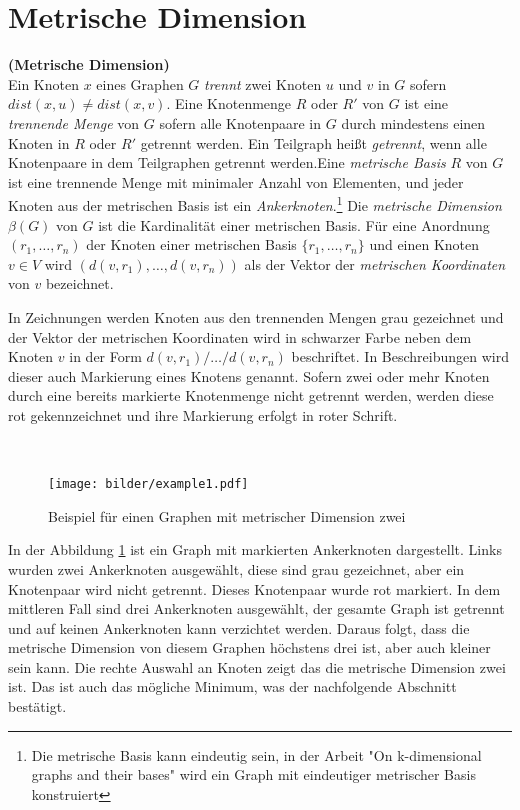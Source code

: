 \newpage
\section{Metrische Dimension}
\label{MDT}
\begin{defi}{\textbf{(Metrische Dimension)}}\\
Ein Knoten $x$ eines Graphen $G$ \emph{trennt} zwei Knoten $u$ und $v$ in $G$ sofern $dist(x, u) \neq dist(x, v)$. Eine Knotenmenge $R$ oder $R'$ von $G$ ist eine \emph{trennende Menge} von $G$ sofern alle Knotenpaare in $G$ durch mindestens einen Knoten in $R$ oder $R'$ getrennt werden. Ein Teilgraph heißt \emph{getrennt}, wenn alle Knotenpaare in dem Teilgraphen getrennt werden.\newline \newline Eine \emph{metrische Basis} $R$ von $G$ ist eine trennende Menge mit minimaler Anzahl von Elementen, und jeder Knoten aus der metrischen Basis ist ein \emph{Ankerknoten}.\footnote{Die metrische Basis kann eindeutig sein, in der Arbeit "On k-dimensional graphs and their bases" \cite{bases} wird ein Graph mit eindeutiger metrischer Basis konstruiert} \newline\newline %
Die \emph{metrische Dimension $\beta(G)$} von $G$ ist die Kardinalität einer metrischen Basis. Für eine Anordnung $(r_1,\ldots,r_n)$ der Knoten einer metrischen Basis $\{r_1,\ldots,r_n\}$ und einen Knoten $v \in V$ wird $(d(v, r_1 ), \ldots , d(v, r_n ))$ als der Vektor der \emph{metrischen Koordinaten} von $v$ bezeichnet.
\end{defi}
\begin{bem}
In Zeichnungen werden Knoten aus den trennenden Mengen grau gezeichnet und der Vektor der metrischen Koordinaten wird in schwarzer Farbe neben dem Knoten $v$ in der Form $d(v, r_1 )/ \ldots / d(v, r_n )$ beschriftet. In Beschreibungen wird dieser auch Markierung eines Knotens genannt. Sofern zwei oder mehr Knoten durch eine bereits markierte Knotenmenge nicht getrennt werden, werden diese rot gekennzeichnet und ihre Markierung erfolgt in roter Schrift. 
\end{bem}
\begin{bsp}~
\begin{figure}[h!]
		\centering 		 
   \texttt{[image: bilder/example1.pdf]}
	\caption{Beispiel für einen Graphen mit metrischer Dimension zwei}
  	 \label{bild:bsp}
  	 \end{figure}
In der Abbildung \ref{bild:bsp} ist ein Graph mit markierten Ankerknoten dargestellt.
Links wurden zwei Ankerknoten ausgewählt, diese sind grau gezeichnet, aber ein Knotenpaar wird nicht getrennt. Dieses Knotenpaar wurde rot markiert. In dem mittleren Fall sind drei Ankerknoten ausgewählt, der gesamte Graph ist getrennt und auf keinen Ankerknoten kann verzichtet werden. Daraus folgt, dass die metrische Dimension von diesem Graphen höchstens drei ist, aber auch kleiner sein kann. Die rechte Auswahl an Knoten zeigt das die metrische Dimension zwei ist. Das ist auch das mögliche Minimum, was der nachfolgende Abschnitt bestätigt.
\end{bsp}
